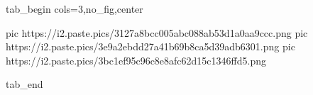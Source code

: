  
 
 
 
 


\ifcmt
  tab_begin cols=3,no_fig,center

     pic https://i2.paste.pics/3127a8bcc005abc088ab53d1a0aa9ccc.png
		 pic https://i2.paste.pics/3e9a2ebdd27a41b69b8ca5d39adb6301.png
		 pic https://i2.paste.pics/3bc1ef95c96c8e8afc62d15c1346ffd5.png

  tab_end
\fi
